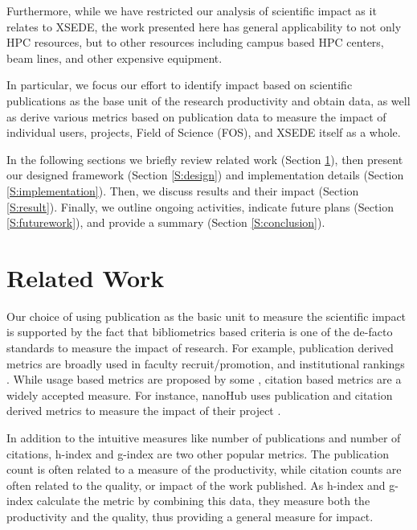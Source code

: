 \documentclass{sig-alternate}
\begin{document}
Furthermore, while we have restricted our analysis of scientific impact as it relates to XSEDE, the work presented here has general applicability to not only HPC resources, but to other resources including campus based HPC centers, beam lines, and other expensive equipment.

In particular, we focus our effort to identify impact based on scientific publications as the base unit of the research productivity and obtain data, as well as derive various metrics based on publication data to measure the impact of individual users, projects, Field of Science (FOS), and XSEDE itself as a whole.

In the following sections we briefly review related work (Section \ref{S:related}), then present our designed framework (Section \ref{S:design}) and implementation details (Section \ref{S:implementation}). Then, we discuss results and their impact (Section \ref{S:result}). Finally, we outline ongoing activities, indicate future plans (Section \ref{S:futurework}), and provide a summary (Section \ref{S:conclusion}).

\section{Related Work} \label{S:related}
Our choice of using publication as the basic unit to measure the scientific impact is supported by the fact that bibliometrics based criteria is one of the de-facto standards to measure the impact of research. For example, publication derived metrics are broadly used in faculty recruit/promotion, and institutional rankings \cite{thomas1998institutional}.  While usage based metrics are proposed by some \cite{Bollen:2007:MUM:1255175.1255273,Bollen:2008:TUI:1378889.1378928, bollen2009principal}, citation based metrics are a widely accepted measure. For instance, nanoHub uses publication and citation derived metrics to measure the impact of their project \cite{www-nanohubcite}.

In addition to the intuitive measures like number of publications and number of citations, h-index \cite{hirsch2005index} and g-index \cite{egghe2006theory} are two other popular metrics. The publication count is often related to a measure of the productivity, while citation counts are often related to the quality, or impact of the work published. As h-index and g-index calculate the metric by combining this data, they measure both the productivity and the quality, thus providing a general measure for impact.
\end{document}
